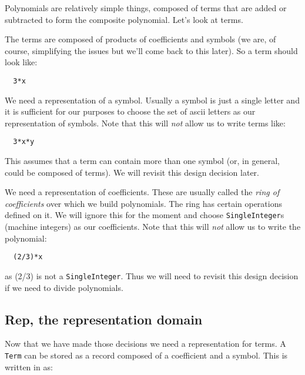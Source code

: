 Polynomials are relatively simple things, composed of terms that are
added or subtracted to form the composite polynomial.
Let's look at terms.

The terms are composed of products of coefficients and symbols (we are,
of course, simplifying the issues but we'll come back to this later).
So a term should look like:

\begin{small}
\begin{verbatim}
  3*x
\end{verbatim}
\end{small}

We need a representation of a symbol. Usually a symbol is just a single
letter and it is sufficient for our purposes to choose the set of ascii
letters as our representation of symbols. Note that this will {\em not\/} allow
us to write terms like:

\begin{small}
\begin{verbatim}  
  3*x*y
\end{verbatim}
\end{small}

This assumes that a term can contain more than one symbol (or, in
general, could be composed of terms). We will revisit this design
decision later.

We need a representation of coefficients. These are usually called the
{\em ring of coefficients} over which we build polynomials. The ring has
certain operations defined on it. We will ignore this for the moment
and choose {\tt SingleInteger}s (machine integers) as our coefficients.
Note that this will {\em not\/} allow us to write the polynomial:

\begin{small}
\begin{verbatim}
  (2/3)*x
\end{verbatim}
\end{small}

as (2/3) is not a \verb"SingleInteger". Thus we will need to revisit this design
decision if we need to divide polynomials.

\subsection{Rep, the representation domain}

Now that we have made those decisions we need a representation for terms.
A \verb"Term" can be stored as a record composed of a coefficient and a symbol.
This is written in \asharp{} as:

